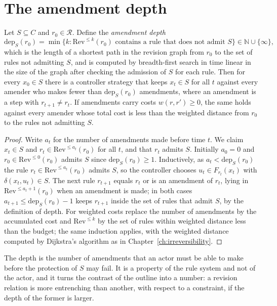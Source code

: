 \section{The amendment depth}

\begin{newresult}\label{thm:depth}
Let $S\subseteq C$ and $r_0\in\mathcal R$. Define the \emph{amendment depth}
\[
\mathrm{dep}_S(r_0)=\min\{k:\mathrm{Rev}^{\le k}(r_0)\text{ contains a rule that does not admit }S\}\in\mathbb N\cup\{\infty\},
\]
which is the length of a shortest path in the revision graph from $r_0$ to the set of rules not admitting $S$, and is computed by breadth-first search in time linear in the size of the graph after checking the admission of $S$ for each rule. Then for every $x_0\in S$ there is a controller strategy that keeps $x_t\in S$ for all $t$ against every amender who makes fewer than $\mathrm{dep}_S(r_0)$ amendments, where an amendment is a step with $r_{t+1}\ne r_t$. If amendments carry costs $w(r,r')\ge0$, the same holds against every amender whose total cost is less than the weighted distance from $r_0$ to the rules not admitting $S$.
\end{newresult}
\begin{proof}
Write $a_t$ for the number of amendments made before time $t$. We claim $x_t\in S$ and $r_t\in\mathrm{Rev}^{\le a_t}(r_0)$ for all $t$, and that $r_t$ admits $S$. Initially $a_0=0$ and $r_0\in\mathrm{Rev}^{\le0}(r_0)$ admits $S$ since $\mathrm{dep}_S(r_0)\ge1$. Inductively, as $a_t<\mathrm{dep}_S(r_0)$ the rule $r_t\in\mathrm{Rev}^{\le a_t}(r_0)$ admits $S$, so the controller chooses $u_t\in F_{r_t}(x_t)$ with $\delta(x_t,u_t)\in S$. The next rule $r_{t+1}$ equals $r_t$ or is an amendment of $r_t$, lying in $\mathrm{Rev}^{\le a_t+1}(r_0)$ when an amendment is made; in both cases $a_{t+1}\le\mathrm{dep}_S(r_0)-1$ keeps $r_{t+1}$ inside the set of rules that admit $S$, by the definition of depth. For weighted costs replace the number of amendments by the accumulated cost and $\mathrm{Rev}^{\le k}$ by the set of rules within weighted distance less than the budget; the same induction applies, with the weighted distance computed by Dijkstra's algorithm as in Chapter~\ref{ch:irreversibility}.
\end{proof}

The depth is the number of amendments that an actor must be able to make before the protection of $S$ may fail. It is a property of the rule system and not of the actor, and it turns the contrast of the outline into a number: a revision relation is more entrenching than another, with respect to a constraint, if the depth of the former is larger.

